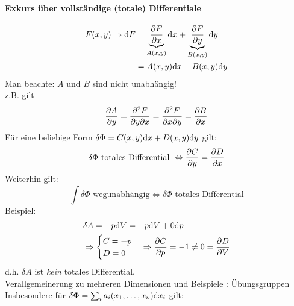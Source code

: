 \begin{enumerate}[a)]
    \paragraph{Exkurs über vollständige (totale) Differentiale}
    \begin{equation}
        \begin{split}
            F(x, y) \Rightarrow \mathrm{d} F &= \underbrace{\frac{\partial F}{\partial x}}_{A(x, y)} \mathrm{d} x + \underbrace{\frac{\partial F}{\partial y}}_{B(x, y)} \mathrm{d} y \\
            &= A(x, y) \mathrm{d} x + B(x, y) \mathrm{d} y
        \end{split}
    \end{equation}
    Man beachte: $A$ und $B$ sind nicht unabhängig! \\
    z.B. gilt
    \begin{equation}
        \frac{\partial A}{\partial y} = \frac{\partial^2 F}{\partial y \partial x} = \frac{\partial^2 F}{\partial x \partial y} = \frac{\partial B}{\partial x}
    \end{equation}
    Für eine beliebige Form $\delta \Phi = C(x, y) \mathrm{d} x + D(x, y) \mathrm{d} y$ gilt:
    \begin{equation}
        \delta \Phi \text{ totales Differential } \Leftrightarrow \frac{\partial C}{\partial y} = \frac{\partial D}{\partial x}
    \end{equation}
    Weiterhin gilt:
    \begin{equation}
        \int \delta \Phi \text{ wegunabhängig} \Leftrightarrow \delta \Phi \text{ totales Differential}
    \end{equation}
    Beispiel:
    \begin{equation}
        \begin{split}
            & \delta A = - p \mathrm{d} V = - p \mathrm{d} V + 0 \mathrm{d} p \\
            & \Rightarrow
            \begin{cases}
                C = - p \\
                D = 0
            \end{cases}
            \Rightarrow \frac{\partial C}{\partial p} = -1 \neq 0 = \frac{\partial D}{\partial V}
        \end{split}
    \end{equation}
    d.h. $\delta A$ ist \emph{kein} totales Differential. \\[\baselineskip]
    Verallgemeinerung zu mehreren Dimensionen und Beispiele : Übungsgruppen \\
    Insbesondere für $\delta \Phi = \sum_i a_i (x_1, \ldots, x_\nu) \mathrm{d} x_i$ gilt:
    \begin{equation}

\end{equation}
\end{enumerate}
